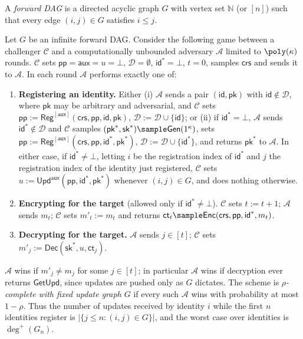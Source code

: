 \documentclass{conjura-conjecture}
\newcommand{\Gen}{\mathsf{Gen}}
\newcommand{\Reg}{\mathsf{Reg}}
\newcommand{\Enc}{\mathsf{Enc}}
\newcommand{\Upd}{\mathsf{Upd}}
\newcommand{\Dec}{\mathsf{Dec}}
\newcommand{\pp}{\mathsf{pp}}
\newcommand{\aux}{\mathsf{aux}}
\newcommand{\crs}{\mathsf{crs}}
\newcommand{\pk}{\mathsf{pk}}
\newcommand{\sk}{\mathsf{sk}}
\newcommand{\id}{\mathsf{id}}
\newcommand{\ct}{\mathsf{ct}}
\newcommand{\GetUpd}{\mathsf{GetUpd}}
\newcommand{\Nat}{\mathbb{N}}
\newcommand{\outdeg}{\deg^{+}}
\begin{document}
\begin{definition}\label{def:dag}
A \emph{forward DAG} is a directed acyclic graph $G$ with vertex set
$\Nat$ (or $[n]$) such that every edge $(i,j) \in G$ satisfies
$i \le j$.
\end{definition}

\begin{definition}\label{def:comp2}
Let $G$ be an infinite forward DAG. Consider the following game between
a challenger $\mathcal{C}$ and a computationally unbounded adversary
$\mathcal{A}$ limited to $\poly(\kappa)$ rounds. $\mathcal{C}$ sets
$\pp = \aux = u = \bot$, $\mathcal{D} = \emptyset$, $\id^{*} = \bot$,
$t = 0$, samples $\crs$ and sends it to $\mathcal{A}$. In each round
$\mathcal{A}$ performs exactly one of:
\begin{enumerate}
  \item \textbf{Registering an identity.} Either (i) $\mathcal{A}$ sends
    a pair $(\id,\pk)$ with $\id \notin \mathcal{D}$, where $\pk$ may be
    arbitrary and adversarial, and $\mathcal{C}$ sets
    $\pp := \Reg^{[\aux]}(\crs,\pp,\id,\pk)$,
    $\mathcal{D} := \mathcal{D}\cup\{\id\}$; or (ii) if
    $\id^{*} = \bot$, $\mathcal{A}$ sends $\id^{*} \notin \mathcal{D}$
    and $\mathcal{C}$ samples $(\pk^{*},\sk^{*}) \sample
    \Gen(1^{\kappa})$, sets
    $\pp := \Reg^{[\aux]}(\crs,\pp,\id^{*},\pk^{*})$,
    $\mathcal{D} := \mathcal{D}\cup\{\id^{*}\}$, and returns $\pk^{*}$
    to $\mathcal{A}$. In either case, if $\id^{*} \neq \bot$, letting
    $i$ be the registration index of $\id^{*}$ and $j$ the registration
    index of the identity just registered, $\mathcal{C}$ sets
    $u := \Upd^{\aux}(\pp,\id^{*},\pk^{*})$ whenever $(i,j) \in G$, and
    does nothing otherwise.
  \item \textbf{Encrypting for the target} (allowed only if
    $\id^{*} \neq \bot$). $\mathcal{C}$ sets $t := t+1$; $\mathcal{A}$
    sends $m_t$; $\mathcal{C}$ sets $m'_t := m_t$ and returns
    $\ct_t \sample \Enc(\crs,\pp,\id^{*},m_t)$.
  \item \textbf{Decrypting for the target.} $\mathcal{A}$ sends
    $j \in [t]$; $\mathcal{C}$ sets $m'_j := \Dec(\sk^{*},u,\ct_j)$.
\end{enumerate}
$\mathcal{A}$ wins if $m'_j \neq m_j$ for some $j \in [t]$; in
particular $\mathcal{A}$ wins if decryption ever returns $\GetUpd$,
since updates are pushed only as $G$ dictates. The scheme is
\emph{$\rho$-complete with fixed update graph $G$} if every such
$\mathcal{A}$ wins with probability at most $1-\rho$. Thus the number of
updates received by identity $i$ while the first $n$ identities register
is $|\{j \le n : (i,j) \in G\}|$, and the worst case over identities is
$\outdeg(G_n)$.
\end{definition}
\end{document}
